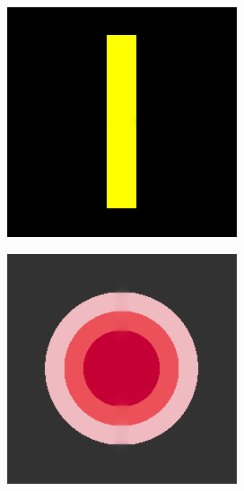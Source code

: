 \documentclass[hidelinks, a4paper,12pt]{article}
\numberwithin{equation}{section}							%
\numberwithin{equation}{section}
\begin{document}
{\begin{figure}[H]
\begin{subfigure}{0.4\linewidth}
		\includegraphics[width=0.8\linewidth]{images/result_ex1/fixpoint01.png}
	\end{subfigure}
	\begin{subfigure}{0.4\linewidth}
		\centering
		\includegraphics[width=0.8\linewidth]{images/result_ex1/fixpoint02.png}
	\end{subfigure}
	\begin{subfigure}{0.4\linewidth}
		\centering

\end{subfigure}
\end{figure}}
\end{document}
